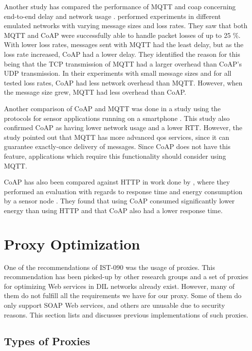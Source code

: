 Another study has compared the performance of MQTT and \gls{coap} concerning
end-to-end delay and network usage \cite{thangavel-mqtt-coap}.
 performed experiments in different emulated
networks with varying message sizes and loss rates. They saw that both MQTT and
CoAP were successfully able to handle packet losses of up to 25 \%. With lower
loss rates, messages sent with MQTT had the least delay, but as the loss rate
increased, CoAP had a lower delay. They identified the reason for this being
that the TCP transmission of MQTT had a larger overhead than CoAP's UDP
transmission. In their experiments with small message sizes and for all tested
loss rates, CoAP had less network overhead than MQTT. However, when the message
size grew, MQTT had less overhead than CoAP.

Another comparison of CoAP and MQTT was done in a study using the protocols for
sensor applications running on a smartphone \cite{caro-mqtt-coap}. This study
also confirmed CoAP as having lower network usage and a lower RTT. However, the
study pointed out that MQTT has more advanced \gls{qos} services, since it can
guarantee exactly-once delivery of messages. Since CoAP does not have this
feature, applications which require this functionality should consider using
MQTT.

CoAP has also been compared against HTTP in work done by
\citeauthor{walter-coap-http}, where they performed an evaluation with regards
to response time and energy consumption by a sensor node
\cite{walter-coap-http}. They found that using CoAP consumed significantly lower
energy than using HTTP and that CoAP also had  a lower response time.

\section{Proxy Optimization}

One of the recommendations of IST-090 was the usage of proxies. This
recommendation has been picked-up by other research groups and a set of proxies
for optimizing Web services in DIL networks already exist. However, many of them
do not fulfill all the requirements we have for our proxy. Some of them do only
support SOAP Web services, and others are unusable due to security reasons. This
section lists and discusses previous implementations of such proxies.

\subsection{Types of Proxies}

